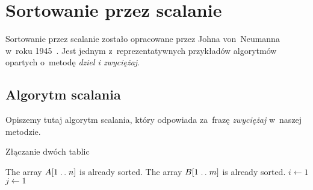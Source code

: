 \section{Sortowanie przez scalanie}

Sortowanie przez scalanie zostało opracowane
przez Johna von~Neumanna w~roku 1945~\cite{merge-sort-wiki}.
Jest jednym z~reprezentatywnych przykładów
algorytmów opartych o~metodę \emph{dziel i zwyciężaj}.

\subsection{Algorytm scalania}
Opiszemy tutaj algorytm scalania, który odpowiada 
za~frazę \emph{zwyciężaj} w~naszej metodzie.

\begin{algorithm}
    \label{alg:merge}
    \caption{Złączanie dwóch tablic}
    \begin{algorithmic}[1]
        \Require The array \( A[1 \mathrel{{.}\,{.}}\nobreak n] \) is already sorted.
        \Ensure The array \( B[1 \mathrel{{.}\,{.}}\nobreak m] \) is already sorted.
            \State \( i \gets 1 \)
            \State \( j \gets 1 \)
            
        \EndProcedure%
    \end{algorithmic}
\end{algorithm}